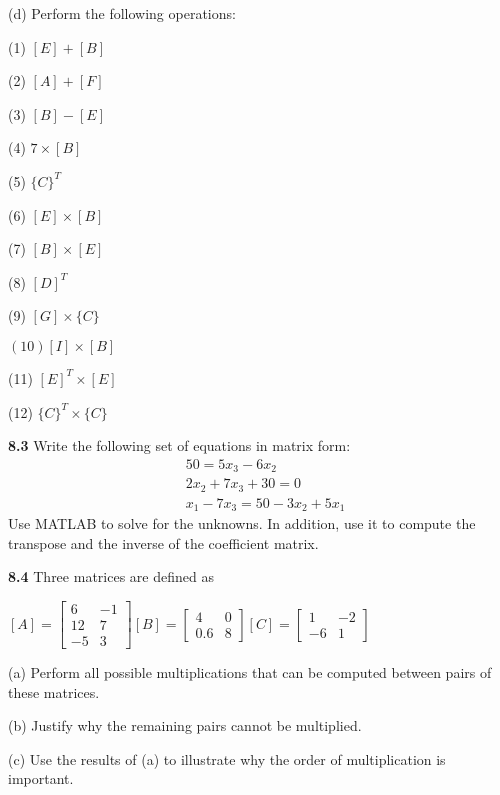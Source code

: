 \documentclass[../main.tex]{subfiles}
\begin{document}
\begin{multicols}{2}
    \noindent (d) Perform the following operations:

    \noindent (1) $[E]+[B]$

    \noindent (2) $[A]+[F]$

    \noindent (3) $[B]-[E]$

    \noindent (4) $7 \times[B]$

    \noindent (5) $\{C\}^{T}$

    \noindent (6) $[E] \times[B]$

    \noindent (7) $[B] \times[E]$

    \noindent (8) $[D]^{T}$
    
    \noindent (9) $[G] \times\{C\}$
    
    \noindent $(10)[I] \times[B]$
    
    \noindent (11) $[E]^{T} \times[E]$
    
    \noindent (12) $\{C\}^{T} \times\{C\}$
    
    \noindent \textbf{8.3} Write the following set of equations in matrix form:
    $$
    \begin{aligned}
    &50=5 x_{3}-6 x_{2} \\
    &2 x_{2}+7 x_{3}+30=0 \\
    &x_{1}-7 x_{3}=50-3 x_{2}+5 x_{1}
    \end{aligned}
    $$
    Use MATLAB to solve for the unknowns. In addition, use it to compute the transpose and the inverse of the coefficient matrix.
    
    \noindent \textbf{8.4} Three matrices are defined as

    \noindent $[A]=\left[\begin{array}{cc}6 & -1 \\ 12 & 7 \\ -5 & 3\end{array}\right][B]=\left[\begin{array}{cc}4 & 0 \\ 0.6 & 8\end{array}\right][C]=\left[\begin{array}{cc}1 & -2 \\ -6 & 1\end{array}\right]$
    
    \noindent (a) Perform all possible multiplications that can be computed between pairs of these matrices.
    
    \noindent (b) Justify why the remaining pairs cannot be multiplied.
    
    \noindent (c) Use the results of (a) to illustrate why the order of multiplication is important.
    

\end{multicols}
\end{document}
